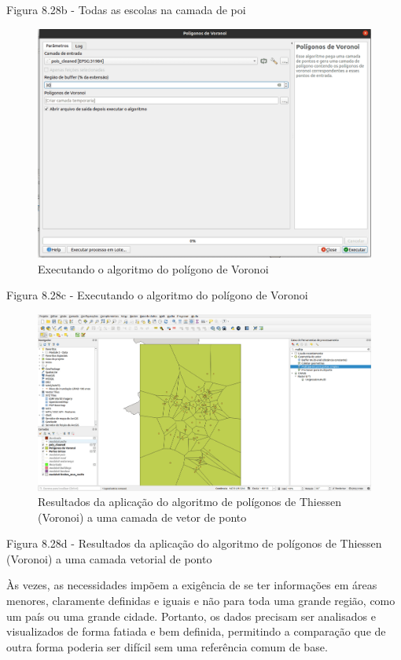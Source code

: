 \documentclass[
]{krantz}
\begin{document}
Figura 8.28b - Todas as escolas na camada de poi

\begin{figure}
\centering
\includegraphics{media/modulo8/fig828_c.png}
\caption{Executando o algoritmo do polígono de Voronoi}
\end{figure}

Figura 8.28c - Executando o algoritmo do polígono de Voronoi

\begin{figure}
\centering
\includegraphics{media/modulo8/fig828_d.png}
\caption{Resultados da aplicação do algoritmo de polígonos de Thiessen (Voronoi) a uma camada de vetor de ponto}
\end{figure}

Figura 8.28d - Resultados da aplicação do algoritmo de polígonos de Thiessen (Voronoi) a uma camada vetorial de ponto

Às vezes, as necessidades impõem a exigência de se ter informações em áreas menores, claramente definidas e iguais e não para toda uma grande região, como um país ou uma grande cidade. Portanto, os dados precisam ser analisados \hspace{0pt}\hspace{0pt}e visualizados de forma fatiada e bem definida, permitindo a comparação que de outra forma poderia ser difícil sem uma referência comum de base.
\end{document}
